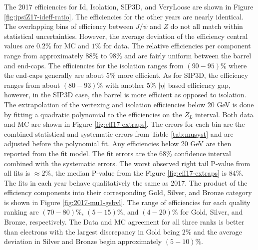  The 2017 efficiencies for Id, Isolation, SIP3D, and VeryLoose are shown in Figure \ref{fig:jpsiZ17-ideff-ratio}. The efficiencies for the other years are nearly identical. The overlapping bins of efficiency between $J/\psi$ and $Z$ do not all match within statistical uncertainties. However, the average deviation of the efficiency central values are $0.2\%$ for MC and $1\%$ for data.  The relative efficiencies per component range from approximately $88\%$ to $98\%$ and are fairly uniform between the barrel and end-caps. The efficiencies for the isolation ranges from $(90 - 95)\%$ where the end-caps generally are about $5\%$ more efficient. As for SIP3D, the efficiency ranges from about $(80 - 93)\%$ with another $5\%$ $|\eta|$ based efficiency gap, however, in the SIP3D case, the barrel is more efficient as opposed to isolation.  The extrapolation of the vertexing and isolation efficiencies below 20 GeV is done by fitting a quadratic polynomial to the efficiencies on the $Z_L$ interval.  Both data and MC are shown in Figure \ref{fig:eff17-extraps}.  The errors for each bin are the combined statistical and systematic errors from Table \ref{tab:musyst} and are adjusted before the polynomial fit. Any efficiencies below 20 GeV are then reported from the fit model. The fit errors are the 68\% confidence interval combined with the systematic errors. The worst observed right tail P-value from all fits is $\approx 2\%$, the median P-value from the Figure \ref{fig:eff17-extraps} is $84\%$. The fits in each year behave qualitatively the same as 2017.
The product of the efficiency components into their corresponding Gold, Silver, and Bronze category is shown in Figure \ref{fig:2017-mu1-gsbvl}. The range of efficiencies for each quality ranking are $(70 - 80)\%$, $(5 - 15)\%$, and $(4 - 20)\%$ for Gold, Silver, and Bronze, respectively. The Data and MC agreement for all three ranks is better than electrons with the largest discrepancy in Gold being $2\%$ and the average deviation in Silver and Bronze begin approximately $(5-10)\%$.




